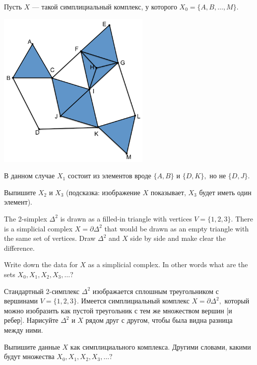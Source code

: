 \documentclass[../main/CT4S-EN-RU]{subfiles}
\begin{document}
\begin{exerciseRUS}
Пусть $X$ — такой симплициальный комплекс, у которого $X_0=\{A,B,\ldots,M\}.$ 
\begin{center}
\includegraphics[height=3in]{OlogNetwork5}
\end{center} 
В данном случае $X_1$ состоит из элементов вроде $\{A,B\}$ и $\{D,K\},$ но не $\{D,J\}.$ 

Выпишите $X_2$ и $X_3$ (подсказка: изображение $X$ показывает, $X_3$ будет иметь один элемент).
\end{exerciseRUS}

\begin{exerciseENG}
The 2-simplex ${Δ}^2$ is drawn as a filled-in triangle with vertices $V=\{1,2,3\}.$ There is a simplicial complex $X=\partial{Δ}^2$ that would be drawn as an empty triangle with the same set of vertices. 
\sexc Draw ${Δ}^2$ and $X$ side by side and make clear the difference.
\item Write down the data for $X$ as a simplicial complex. In other words what are the sets $X_0, X_1, X_2, X_3,\ldots?$
\endsexc
\end{exerciseENG}

\begin{exerciseRUS}
Стандартный 2-симплекс ${Δ}^2$ изображается сплошным треугольником с вершинами $V=\{1,2,3\}.$ Имеется симплициальный комплекс $X=\partial{Δ}^2,$ который можно изобразить как пустой треугольник с тем же множеством вершин [и ребер]. 
\sexc Нарисуйте ${Δ}^2$ и $X$ рядом друг с другом, чтобы была видна разница между ними.
\item Выпишите данные $X$ как симплициального комплекса. Другими словами, какими будут множества $X_0, X_1, X_2, X_3,\ldots?$
\endsexc
\end{exerciseRUS}
\end{document}
